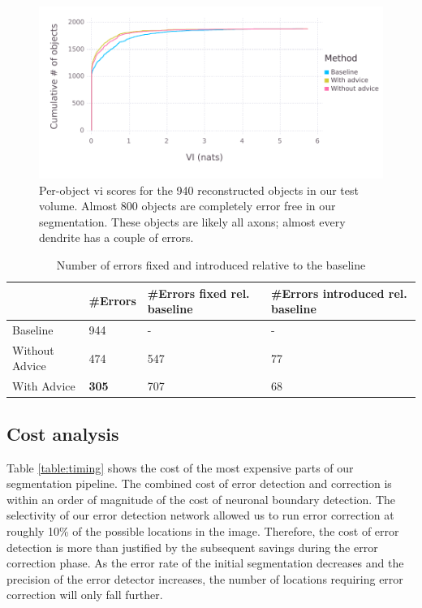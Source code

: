 \documentclass{article}
\begin{document}
\begin{figure}
\begin{center}
\includegraphics[width=0.65\linewidth]{per_object_vi.pdf}
\caption{Per-object vi scores for the 940 reconstructed objects in our test volume. Almost 800 objects are completely error free in our segmentation. These objects are likely all axons; almost every dendrite has a couple of errors.}
\label{fig:decomp_vi_scores}
\end{center}
\end{figure}

\begin{table}[h]
  \caption{Number of errors fixed and introduced relative to the baseline}
  \label{table:errors_fixed}
  \centering
  \begin{tabular}{llll}
    \toprule
	& \#Errors & \#Errors fixed rel. baseline & \#Errors introduced rel. baseline\\
    \midrule
    Baseline & 944 & - & - \\
    Without Advice & 474 & 547 & 77\\
	With Advice & \textbf{305} & 707 & 68\\
    \bottomrule
  \end{tabular}
\end{table}


\subsection{Cost analysis}
Table \ref{table:timing} shows the cost of the most expensive parts of our segmentation pipeline. The combined cost of error detection and correction is within an order of magnitude of the cost of neuronal boundary detection. The selectivity of our error detection network allowed us to run error correction at roughly 10\% of the possible locations in the image. Therefore, the cost of error detection is more than justified by the subsequent savings during the error correction phase. As the error rate of the initial segmentation decreases and the precision of the error detector increases, the number of locations requiring error correction will only fall further.
\end{document}
